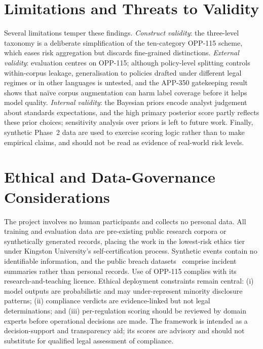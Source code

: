 \documentclass[conference]{IEEEtran}
\begin{document}
\section{Limitations and Threats to Validity}\label{sec:limitations}
Several limitations temper these findings. \emph{Construct validity}: the
three-level taxonomy is a deliberate simplification of the ten-category
OPP-115 scheme, which eases risk aggregation but discards fine-grained
distinctions. \emph{External validity}: evaluation centres on OPP-115;
although policy-level splitting controls within-corpus leakage, generalisation
to policies drafted under different legal regimes or in other languages is
untested, and the APP-350 gatekeeping result shows that na\"ive corpus
augmentation can harm label coverage before it helps model quality.
\emph{Internal validity}: the Bayesian priors encode
analyst judgement about standards expectations, and the high primary posterior
score partly reflects these prior choices; sensitivity analysis over priors is
left to future work. Finally, synthetic Phase~2 data are used to exercise
scoring logic rather than to make empirical claims, and should not be read as
evidence of real-world risk levels.

\section{Ethical and Data-Governance Considerations}\label{sec:ethics}
The project involves no human participants and collects no personal data. All
training and evaluation data are pre-existing public research corpora or
synthetically generated records, placing the work in the lowest-risk ethics
tier under Kingston University's self-certification process. Synthetic events
contain no identifiable information, and the public breach
datasets~\cite{enisa_tl_2024,prc_breaches} comprise incident summaries rather
than personal records. Use of OPP-115 complies with its research-and-teaching
licence. Ethical deployment constraints remain central: (i) model outputs are
probabilistic and may under-represent minority disclosure patterns;
(ii) compliance verdicts are evidence-linked but not legal determinations;
and (iii) per-regulation scoring should be reviewed by domain experts before
operational decisions are made. The framework is intended as a
decision-support and transparency aid; its scores are advisory and should not
substitute for qualified legal assessment of compliance.
\end{document}
